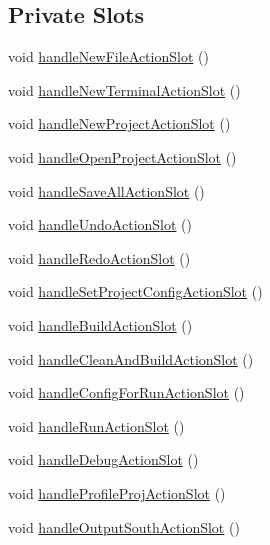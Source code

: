 \subsection*{Private Slots}
\begin{DoxyCompactItemize}
\item 
void \hyperlink{class_master_actions_a75943822eee1dbbc3e7c6c1dda4780a0}{handle\-New\-File\-Action\-Slot} ()
\item 
void \hyperlink{class_master_actions_af1fa0d0d7b074abb49ae5dd6bccffbe9}{handle\-New\-Terminal\-Action\-Slot} ()
\item 
void \hyperlink{class_master_actions_a81d07306e15f16a66e992138faccfab5}{handle\-New\-Project\-Action\-Slot} ()
\item 
void \hyperlink{class_master_actions_abefe5adf2e269a408626ea1caee182ca}{handle\-Open\-Project\-Action\-Slot} ()
\item 
void \hyperlink{class_master_actions_a92d9fcaac21c09534c568b3aca195a87}{handle\-Save\-All\-Action\-Slot} ()
\item 
void \hyperlink{class_master_actions_a87a24d9944e6140a6ae0de92dc8e5647}{handle\-Undo\-Action\-Slot} ()
\item 
void \hyperlink{class_master_actions_a7aa83031542aeafb3f3afe244ce2cd67}{handle\-Redo\-Action\-Slot} ()
\item 
void \hyperlink{class_master_actions_a8b46b8a5873dfff5a85e21a7e636b4bf}{handle\-Set\-Project\-Config\-Action\-Slot} ()
\item 
void \hyperlink{class_master_actions_aa9af30e92d9f9e4ffb8044f092b06d07}{handle\-Build\-Action\-Slot} ()
\item 
void \hyperlink{class_master_actions_ac3621bfbde9a2b681d4d35ae72bd6f14}{handle\-Clean\-And\-Build\-Action\-Slot} ()
\item 
void \hyperlink{class_master_actions_a294fc01ac639ffcdf9b76378f0d21306}{handle\-Config\-For\-Run\-Action\-Slot} ()
\item 
void \hyperlink{class_master_actions_a8504741522d18cb1a5fb21b6ad6de14b}{handle\-Run\-Action\-Slot} ()
\item 
void \hyperlink{class_master_actions_acc96d5f9401e97aa2a4700a47cfa71bd}{handle\-Debug\-Action\-Slot} ()
\item 
void \hyperlink{class_master_actions_a3f26362ca8be862aa42fae90535800f0}{handle\-Profile\-Proj\-Action\-Slot} ()
\item 
void \hyperlink{class_master_actions_afb11d896980c526784b05a440e6f21ac}{handle\-Output\-South\-Action\-Slot} ()

\end{DoxyCompactItemize}
